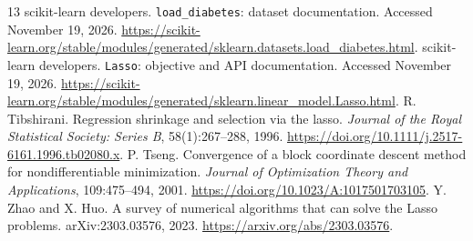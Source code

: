 \documentclass{article}
\begin{document}
\begin{thebibliography}{13}
 scikit-learn developers. \texttt{load\_diabetes}: dataset documentation. Accessed November 19, 2026. \url{https://scikit-learn.org/stable/modules/generated/sklearn.datasets.load_diabetes.html}.
 scikit-learn developers. \texttt{Lasso}: objective and API documentation. Accessed November 19, 2026. \url{https://scikit-learn.org/stable/modules/generated/sklearn.linear_model.Lasso.html}.
 R. Tibshirani. Regression shrinkage and selection via the lasso. \emph{Journal of the Royal Statistical Society: Series B}, 58(1):267--288, 1996. \url{https://doi.org/10.1111/j.2517-6161.1996.tb02080.x}.
 P. Tseng. Convergence of a block coordinate descent method for nondifferentiable minimization. \emph{Journal of Optimization Theory and Applications}, 109:475--494, 2001. \url{https://doi.org/10.1023/A:1017501703105}.
 Y. Zhao and X. Huo. A survey of numerical algorithms that can solve the Lasso problems. arXiv:2303.03576, 2023. \url{https://arxiv.org/abs/2303.03576}.
\end{thebibliography}
\end{document}

